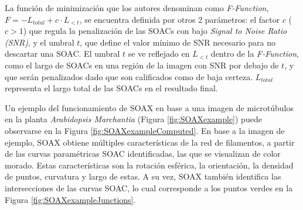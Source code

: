 La funci\'on de minimizaci\'on que los autores denominan como  \textit{F-Function}, $F = -L_{total} + {c}\cdot L_{<t}$, se encuentra definida por otros 2 par\'ametros: el factor $c$ ($c > 1$) que regula la penalizaci\'on de las SOACs con bajo \textit{Signal to Noise Ratio (SNR)}, y el umbral $t$, que define el valor mínimo de SNR necesario para no descartar una SOAC. El umbral $t$ se ve reflejado en $L_{<t}$ dentro de la \textit{F-Function}, como el largo de SOACs en una regi\'on de la imagen con SNR por debajo de $t$, y que ser\'an penalizados dado que son calificados como de baja certeza. $L_{total}$ representa el largo total de las SOACs en el resultado final.





Un ejemplo del funcionamiento de SOAX en base a una imagen de microt\'ubulos en la planta {\it Arabidopsis Marchantia} (Figura \ref{fig:SOAXexample}) puede observarse en la Figura \ref{fig:SOAXexampleComputed}. En base a la imagen de ejemplo, SOAX obtiene m\'ultiples caracter\'isticas de la red de filamentos, a partir de las curvas param\'etricas SOAC identificadas, las que se visualizan de color morado. Estas caracter\'isticas son la rotaci\'on esf\'erica, la orientaci\'on, la densidad de puntos, curvatura y largo de estas. A su vez, SOAX tambi\'en identifica las intersecciones de las curvas SOAC, lo cual corresponde a los puntos verdes en la Figura \ref{fig:SOAXexampleJunctions}.

